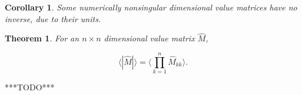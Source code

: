 \documentclass[10pt,letterpaper]{article}
\newtheorem{thm}{Theorem}[section]
\newtheorem{cor}{Corollary}[section]
\numberwithin{equation}{section}
\begin{document}
\begin{cor}Some numerically nonsingular dimensional value matrices
  have no inverse, due to their units.\end{cor}

\begin{thm}For an $n \times n$ dimensional value matrix $\hat M$,

\[ \langle | \hat M | \rangle = \langle \prod_{k=1}^n \hat M_{kk} \rangle . \] \end{thm}

***TODO***
\end{document}
